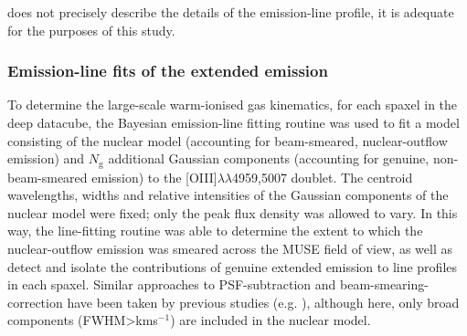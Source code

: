 does not precisely describe the details of the emission-line profile, it is adequate for the purposes of this study.

\subsubsection{Emission-line fits of the extended emission}
\label{section: muse_f13451_1232: analysis_and_results: seeing: extended_emission_fits}

To determine the large-scale warm-ionised gas kinematics, for each spaxel in the deep datacube, the Bayesian emission-line fitting routine was used to fit a model consisting of the nuclear model (accounting for beam-smeared, nuclear-outflow emission) and $N_\mathrm{g}$ additional Gaussian components (accounting for genuine, non-beam-smeared emission) to the [OIII]$\lambda\lambda$4959,5007 doublet. The centroid wavelengths, widths and relative intensities of the Gaussian components of the nuclear model were fixed; only the peak flux density was allowed to vary. In this way, the line-fitting routine was able to determine the extent to which the nuclear-outflow emission was smeared across the MUSE field of view, as well as detect and isolate the contributions of genuine extended emission to line profiles in each spaxel. Similar approaches to PSF-subtraction and beam-smearing-correction have been taken by previous studies (e.g. \citealt{Carniani2015, Kakkad2020, Speranza2024}), although here, only broad components (FWHM\;\textgreater{}\;km\;s$^{-1}$) are included in the nuclear model.



